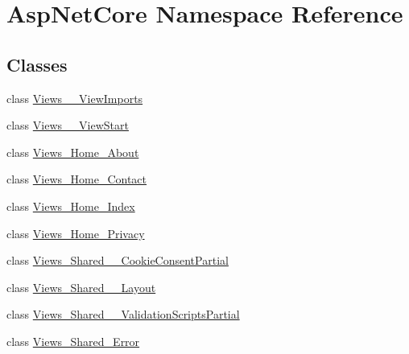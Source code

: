 \hypertarget{namespace_asp_net_core}{}\section{Asp\+Net\+Core Namespace Reference}
\label{namespace_asp_net_core}
\subsection*{Classes}
\begin{DoxyCompactItemize}
\item 
class \mbox{\hyperlink{class_asp_net_core_1_1_views_____view_imports}{Views\+\_\+\+\_\+\+View\+Imports}}
\item 
class \mbox{\hyperlink{class_asp_net_core_1_1_views_____view_start}{Views\+\_\+\+\_\+\+View\+Start}}
\item 
class \mbox{\hyperlink{class_asp_net_core_1_1_views___home___about}{Views\+\_\+\+Home\+\_\+\+About}}
\item 
class \mbox{\hyperlink{class_asp_net_core_1_1_views___home___contact}{Views\+\_\+\+Home\+\_\+\+Contact}}
\item 
class \mbox{\hyperlink{class_asp_net_core_1_1_views___home___index}{Views\+\_\+\+Home\+\_\+\+Index}}
\item 
class \mbox{\hyperlink{class_asp_net_core_1_1_views___home___privacy}{Views\+\_\+\+Home\+\_\+\+Privacy}}
\item 
class \mbox{\hyperlink{class_asp_net_core_1_1_views___shared_____cookie_consent_partial}{Views\+\_\+\+Shared\+\_\+\+\_\+\+Cookie\+Consent\+Partial}}
\item 
class \mbox{\hyperlink{class_asp_net_core_1_1_views___shared_____layout}{Views\+\_\+\+Shared\+\_\+\+\_\+\+Layout}}
\item 
class \mbox{\hyperlink{class_asp_net_core_1_1_views___shared_____validation_scripts_partial}{Views\+\_\+\+Shared\+\_\+\+\_\+\+Validation\+Scripts\+Partial}}
\item 
class \mbox{\hyperlink{class_asp_net_core_1_1_views___shared___error}{Views\+\_\+\+Shared\+\_\+\+Error}}
\end{DoxyCompactItemize}

